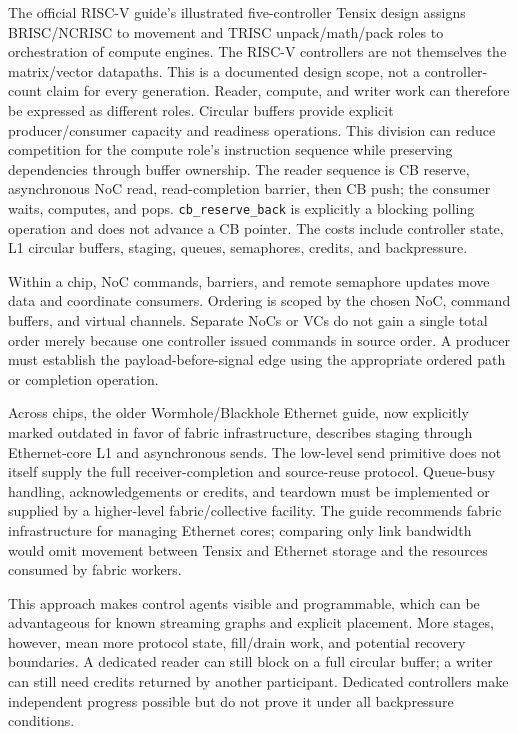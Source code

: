 The official RISC-V guide's illustrated five-controller Tensix design assigns BRISC/NCRISC to movement and TRISC unpack/math/pack roles to orchestration of compute engines. The RISC-V controllers are not themselves the matrix/vector datapaths. This is a documented design scope, not a controller-count claim for every generation. Reader, compute, and writer work can therefore be expressed as different roles. Circular buffers provide explicit producer/consumer capacity and readiness operations. This division can reduce competition for the compute role's instruction sequence while preserving dependencies through buffer ownership. The reader sequence is CB reserve, asynchronous NoC read, read-completion barrier, then CB push; the consumer waits, computes, and pops. \texttt{cb\_reserve\_back} is explicitly a blocking polling operation and does not advance a CB pointer. The costs include controller state, L1 circular buffers, staging, queues, semaphores, credits, and backpressure.\citep{u006-tt-riscv,u006-tt-cb,u006-tt-roles}

Within a chip, NoC commands, barriers, and remote semaphore updates move data and coordinate consumers. Ordering is scoped by the chosen NoC, command buffers, and virtual channels. Separate NoCs or VCs do not gain a single total order merely because one controller issued commands in source order. A producer must establish the payload-before-signal edge using the appropriate ordered path or completion operation.~\citep{u006-tt-ordering}

Across chips, the older Wormhole/Blackhole Ethernet guide, now explicitly marked outdated in favor of fabric infrastructure, describes staging through Ethernet-core L1 and asynchronous sends. The low-level send primitive does not itself supply the full receiver-completion and source-reuse protocol. Queue-busy handling, acknowledgements or credits, and teardown must be implemented or supplied by a higher-level fabric/collective facility. The guide recommends fabric infrastructure for managing Ethernet cores; comparing only link bandwidth would omit movement between Tensix and Ethernet storage and the resources consumed by fabric workers.~\citep{u006-tt-ethernet}

This approach makes control agents visible and programmable, which can be advantageous for known streaming graphs and explicit placement. More stages, however, mean more protocol state, fill/drain work, and potential recovery boundaries. A dedicated reader can still block on a full circular buffer; a writer can still need credits returned by another participant. Dedicated controllers make independent progress possible but do not prove it under all backpressure conditions.

